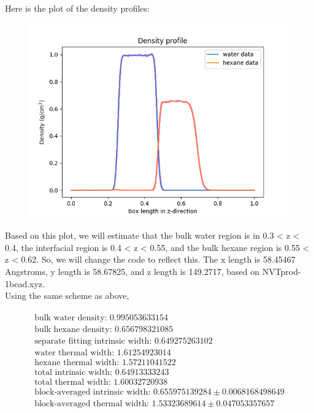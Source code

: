 \documentclass[12pt,reqno]{amsart}
\numberwithin{equation}{section}
\begin{document}
\begin{enumerate}
Here is the plot of the density profiles:

\begin{figure}[H]
\centering
\includegraphics[scale=0.6]{interface_density_profile_NVTprod-1bead}
\end{figure}

Based on this plot, we will estimate that the bulk water region is in 0.3 < z < 0.4, the interfacial region is 0.4 < z < 0.55, and the bulk hexane region is 0.55 < z < 0.62.  So, we will change the code to reflect this.  The x length is 58.45467 Angstroms, y length is 58.67825, and z length is 149.2717, based on NVTprod-1bead.xyz. \\

Using the same scheme as above, 


\begin{align}
\begin{split}
\text{bulk water density: } 0.995053633154 \\
\text{bulk hexane density: } 0.656798321085 \\
\text{separate fitting intrinsic width: } 0.649275263102 \\
\text{water thermal width: } 1.61254923014 \\
\text{hexane thermal width: } 1.57211041522 \\
\text{total intrinsic width: } 0.64913333243 \\
\text{total thermal width: } 1.60032720938 \\
\text{block-averaged intrinsic width: } 0.655975139284 \pm 0.0068168498649 \\
\text{block-averaged thermal width: } 1.53323689614 \pm 0.047053357657 \\
\end{split}
\end{align} 


\end{enumerate}
\end{document}
